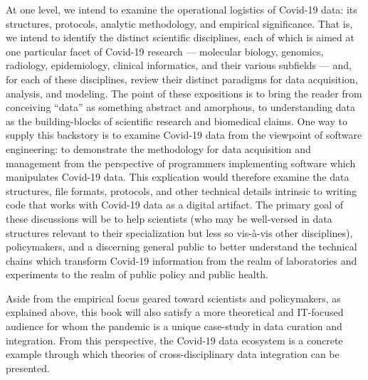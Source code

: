 \documentclass{statsoc}
\newcommand{\p}[1]{

\vspace{.75em}#1}
\newcommand{\textscc}[1]{{\color{orr!35!black}{{%
						\fontfamily{Cabin-TLF}\fontseries{b}\selectfont{\textsc{\scriptsize{#1}}}}}}}
\newcommand{\AcronymText}[1]{{\textscc{#1}}}
\newcommand{\q}[1]{{\fontfamily{qcr}\selectfont ``}#1{\fontfamily{qcr}\selectfont ''}}
\newcommand{\API}{\resizebox{!}{7pt}{\AcronymText{API}}}
\newcommand{\visavis}{vis-\`a-vis}
\begin{document}
{%
\p{At one level, we intend to examine the 
operational logistics of Covid-19 data: its 
structures, protocols, analytic methodology, 
and empirical significance.  That is, we 
intend to identify the distinct scientific 
disciplines, each of which is aimed at one 
particular facet of Covid-19 research --- molecular 
biology, genomics, radiology, epidemiology, clinical 
informatics, and their various subfields 
--- and, for each of these disciplines, 
review their distinct paradigms for 
data acquisition, analysis, and modeling.  
The point of these expositions is to bring 
the reader from conceiving \q{data} as something 
abstract and amorphous, to understanding 
data as the building-blocks of scientific 
research and biomedical claims.  One way to supply this backstory 
is to examine Covid-19 data from the viewpoint 
of software engineering: to demonstrate 
the methodology for data acquisition and 
management from the perspective of programmers 
implementing software which manipulates Covid-19 data.  
This explication would therefore examine the 
data structures, file formats, \API{} protocols, 
and other technical details intrinsic to writing 
code that works with Covid-19 data as a 
digital artifact.  The primary 
goal of these discussions will be to help 
scientists (who may be well-versed in data 
structures relevant to their specialization 
but less so \visavis{} other disciplines), 
policymakers, and a discerning general public 
to better understand the technical chains which transform 
Covid-19 information from the realm of 
laboratories and experiments to the realm of 
public policy and public health.}


\p{Aside from the empirical focus geared toward scientists and 
policymakers, as explained above, this book will also satisfy a 
more theoretical and IT-focused audience for whom the 
pandemic is a unique case-study in data 
curation and integration.  From this perspective, 
the Covid-19 data ecosystem is a concrete example 
through which theories of cross-disciplinary data integration 
can be presented.}


}
\end{document}

